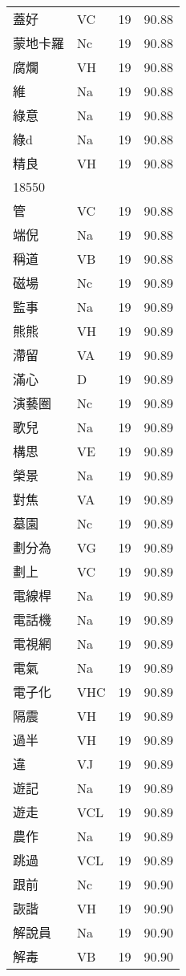 \documentclass[twocolumn]{book}
\begin{document}
\begin{supertabular}{llrr}
蓋好 & VC & 19 &  90.88\\
蒙地卡羅 & Nc & 19 &  90.88\\
腐爛 & VH & 19 &  90.88\\
維 & Na & 19 &  90.88\\
綠意 & Na & 19 &  90.88\\
綠d & Na & 19 &  90.88\\
精良 & VH & 19 &  90.88\\
18550\\
管 & VC & 19 &  90.88\\
端倪 & Na & 19 &  90.88\\
稱道 & VB & 19 &  90.88\\
磁場 & Nc & 19 &  90.89\\
監事 & Na & 19 &  90.89\\
熊熊 & VH & 19 &  90.89\\
滯留 & VA & 19 &  90.89\\
滿心 & D & 19 &  90.89\\
演藝圈 & Nc & 19 &  90.89\\
歌兒 & Na & 19 &  90.89\\
構思 & VE & 19 &  90.89\\
榮景 & Na & 19 &  90.89\\
對焦 & VA & 19 &  90.89\\
墓園 & Nc & 19 &  90.89\\
劃分為 & VG & 19 &  90.89\\
劃上 & VC & 19 &  90.89\\
電線桿 & Na & 19 &  90.89\\
電話機 & Na & 19 &  90.89\\
電視網 & Na & 19 &  90.89\\
電氣 & Na & 19 &  90.89\\
電子化 & VHC & 19 &  90.89\\
隔震 & VH & 19 &  90.89\\
過半 & VH & 19 &  90.89\\
違 & VJ & 19 &  90.89\\
遊記 & Na & 19 &  90.89\\
遊走 & VCL & 19 &  90.89\\
農作 & Na & 19 &  90.89\\
跳過 & VCL & 19 &  90.89\\
跟前 & Nc & 19 &  90.90\\
詼諧 & VH & 19 &  90.90\\
解說員 & Na & 19 &  90.90\\
解毒 & VB & 19 &  90.90\\

\end{supertabular}
\end{document}
